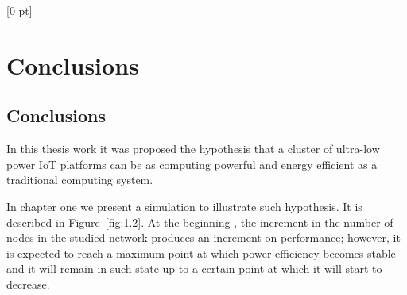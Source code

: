 \titlespacing{\chapter}{0 pt}{30 pt}{50 pt}[0 pt]
\titleformat{\section}{\Large\bfseries}{\thesection}{0 pt}{\hspace{30 pt}}
\titleformat{\subsection}{\large\bfseries}{\thesubsection}{0 pt}{\hspace{30 pt}}
\pagestyle{fancy}
\fancyhead[LO,LE]{\footnotesize\emph{\leftmark}}
\fancyhead[RO,RE]{\thepage}
\fancyfoot[CO,CE]{}

\chapter{Conclusions}

\normalsize
\noindent

\section{Conclusions}
\noindent

In this thesis work it was proposed the hypothesis that a cluster of ultra-low
power IoT platforms can be as computing powerful and energy efficient as a
traditional computing system.

In chapter one we present a simulation to illustrate such hypothesis. It is described in
Figure~\ref{fig:1.2}.  At the beginning , the increment in the number of nodes
in the studied network produces an increment on performance; however, it is
expected to reach a maximum point at which power efficiency becomes stable and
it will remain in such state up to a certain point at which it will start to
decrease. 

